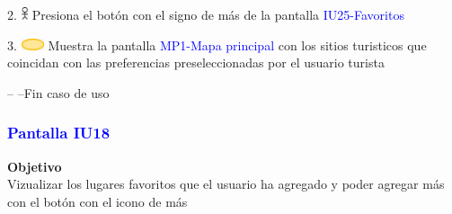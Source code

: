       2. \includegraphics[width=0.0150\textwidth]{Figuras/PERSONA.png} Presiona el botón con el signo de más de la pantalla \textcolor{blue}{IU25-Favoritos}

    3. \includegraphics[width=0.0500\textwidth]{Figuras/sistema.png} Muestra la pantalla \textcolor{blue}{MP1-Mapa principal} con los sitios turisticos que coincidan con las preferencias preseleccionadas por el usuario turista

    -- --Fin caso de uso
    
\subsubsection{\textcolor{blue}{Pantalla IU18}}

\textbf{Objetivo} \\
Vizualizar los lugares favoritos que el usuario ha agregado y poder agregar más con el botón con el icono de más

